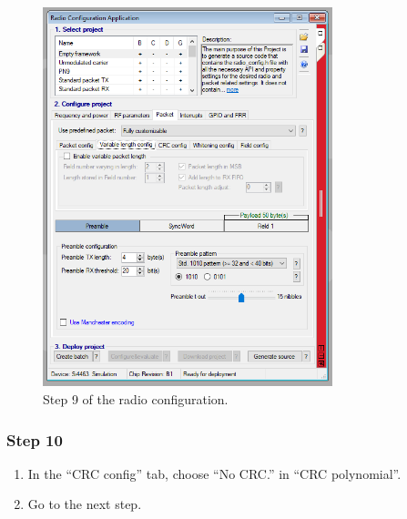 \begin{figure}[!h]
	\begin{center}
		\includegraphics[width=0.75\textwidth]{figures/wds-tutorial/wds-tutorial-9.png}
		\caption{Step 9 of the radio configuration.}
		\label{fig:wds-tutorial-step-9}
	\end{center}
\end{figure}

\subsubsection{Step 10}

\begin{enumerate}
    \item In the ``CRC config'' tab, choose ``No CRC.'' in ``CRC polynomial''.
    \item Go to the next step.
\end{enumerate}

